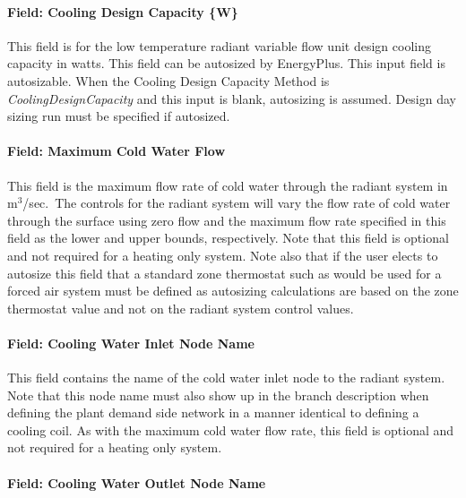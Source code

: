 \paragraph{Field: Cooling Design Capacity \{W\}}\label{field-cooling-design-capacity-w-000}

This field is for the low temperature radiant variable flow unit design cooling capacity in watts. This field can be autosized by EnergyPlus. This input field is autosizable. When the Cooling Design Capacity Method is \emph{CoolingDesignCapacity} and this input is blank, autosizing is assumed. Design day sizing run must be specified if autosized.

\paragraph{Field: Maximum Cold Water Flow}\label{field-maximum-cold-water-flow}

This field is the maximum flow rate of cold water through the radiant system in m\(^{3}\)/sec.~The controls for the radiant system will vary the flow rate of cold water through the surface using zero flow and the maximum flow rate specified in this field as the lower and upper bounds, respectively. Note that this field is optional and not required for a heating only system. Note also that if the user elects to autosize this field that a standard zone thermostat such as would be used for a forced air system must be defined as autosizing calculations are based on the zone thermostat value and not on the radiant system control values.

\paragraph{Field: Cooling Water Inlet Node Name}\label{field-cooling-water-inlet-node-name-000}

This field contains the name of the cold water inlet node to the radiant system. Note that this node name must also show up in the branch description when defining the plant demand side network in a manner identical to defining a cooling coil. As with the maximum cold water flow rate, this field is optional and not required for a heating only system.

\paragraph{Field: Cooling Water Outlet Node Name}\label{field-cooling-water-outlet-node-name-000}


